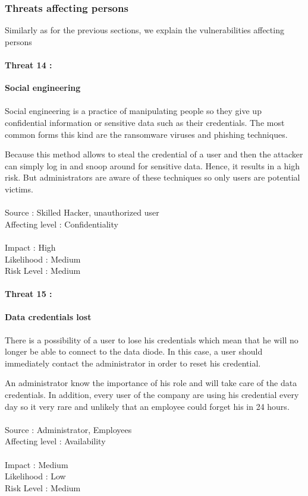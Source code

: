 \documentclass[a4paper,10pt]{article}
\begin{document}
\subsubsection{Threats affecting persons}
Similarly as for the previous sections, we explain the vulnerabilities affecting persons

\paragraph{Threat 14 :} \textbf{Social engineering} 
\paragraph{}Social engineering is a practice of manipulating people so they give up confidential information or sensitive data such as their credentials. The most common forms this kind are the ransomware viruses and phishing techniques. 

Because this method allows to steal the credential of a user and then the attacker can simply log in and snoop around for sensitive data. Hence, it results in a high risk. But administrators are aware of these techniques so only users are potential victims. \\ \\ 
Source : Skilled Hacker, unauthorized user \\
Affecting level : Confidentiality  \\ \\
Impact : High \\
Likelihood : Medium \\
Risk Level : Medium

\paragraph{Threat 15 :} \textbf{Data credentials lost}
\paragraph{}There is a possibility of a user to lose his credentials which mean that he will no longer be able to connect to the data diode. In this case, a user should immediately contact the administrator in order to reset his credential.

An administrator know the importance of his role and will take care of the data credentials. In addition, every user of the company are using his credential every day so it very rare and unlikely that an employee could forget his in 24 hours. \\  \\ 
Source : Administrator, Employees  \\
Affecting level : Availability \\ \\
Impact : Medium \\
Likelihood : Low \\
Risk Level : Medium
\end{document}
